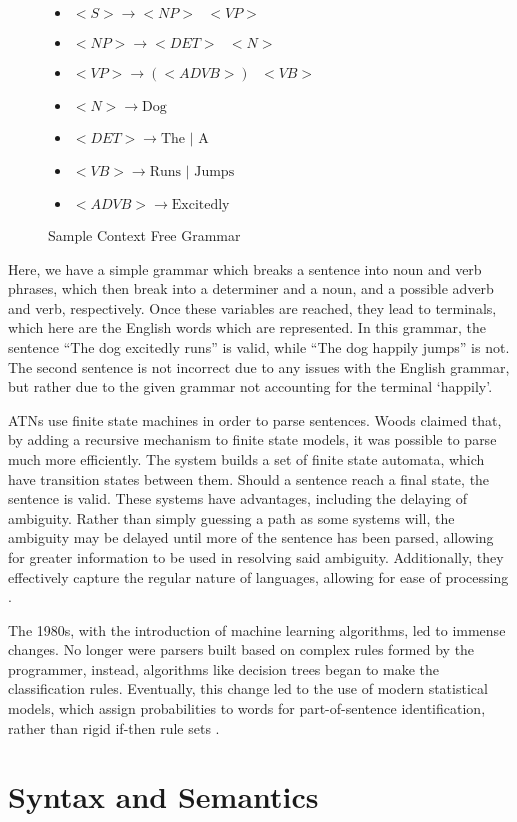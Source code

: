 \begin{center}
\begin{figure}[H]
\begin{center}

\begin{itemize}

	\item $<S> \rightarrow <NP> \text{ } <VP>$
	\item $<NP> \rightarrow <DET> \text{ } <N>$
	\item $<VP> \rightarrow (<ADVB>) \text{ } <VB>$
	\item $<N> \rightarrow \text{Dog}$
	\item $<DET> \rightarrow \text{The | A}$
	\item $<VB> \rightarrow \text{Runs | Jumps}$
	\item $<ADVB> \rightarrow \text{Excitedly}$

\end{itemize}
\end{center}
\caption{Sample Context Free Grammar}
\end{figure}
\end{center}


Here, we have a simple grammar which breaks a sentence into noun and verb phrases, which then break into a determiner and a noun, and a possible adverb and verb, respectively. Once these variables are reached, they lead to terminals, which here are the English words which are represented. In this grammar, the sentence ``The dog excitedly runs'' is valid, while ``The dog happily jumps'' is not. The second sentence is not incorrect due to any issues with the English grammar, but rather due to the given grammar not accounting for the terminal `happily'.

ATNs use finite state machines in order to parse sentences. Woods claimed that, by adding a recursive mechanism to finite state models, it was possible to parse much more efficiently. The system builds a set of finite state automata, which have transition states between them. Should a sentence reach a final state, the sentence is valid. These systems have advantages, including the delaying of ambiguity. Rather than simply guessing a path as some systems will, the ambiguity may be delayed until more of the sentence has been parsed, allowing for greater information to be used in resolving said ambiguity. Additionally, they effectively capture the regular nature of languages, allowing for ease of processing \cite{ATN}.

The 1980s, with the introduction of machine learning algorithms, led to immense changes. No longer were parsers built based on complex rules formed by the programmer, instead, algorithms like decision trees began to make the classification rules. Eventually, this change led to the use of modern statistical models, which assign probabilities to words for part-of-sentence identification, rather than rigid if-then rule sets \cite{1980}.

\section{Syntax and Semantics}

